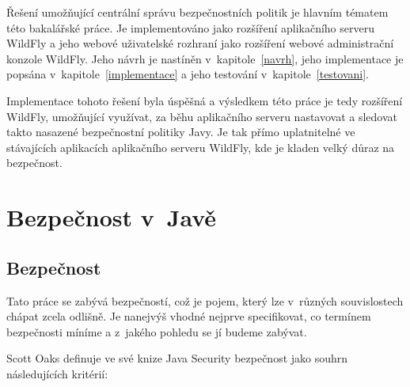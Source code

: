 Řešení umožňující centrální správu bezpečnostních politik je hlavním tématem této bakalářské práce.
Je implementováno jako rozšíření aplikačního serveru WildFly a jeho webové uživatelské rozhraní jako rozšíření webové administrační konzole WildFly.
Jeho návrh je nastíněn v~kapitole~\ref{navrh}, jeho implementace je popsána v~kapitole~\ref{implementace} a jeho testování v~kapitole~\ref{testovani}.

Implementace tohoto řešení byla úspěšná a výsledkem této práce je tedy rozšíření WildFly, umožňující využívat, za běhu aplikačního serveru
nastavovat a sledovat takto nasazené bezpečnostní politiky Javy.
Je tak přímo uplatnitelné ve stávajících aplikacích aplikačního serveru WildFly, kde je kladen velký důraz na bezpečnost.

\chapter{Bezpečnost v~Javě} \label{teoretickyUvod}

\section{Bezpečnost}

Tato práce se zabývá bezpečností, což je pojem, který lze v~různých souvislostech chápat zcela odlišně. Je nanejvýš vhodné nejprve specifikovat, co termínem bezpečnosti míníme a z~jakého pohledu se jí budeme zabývat.

Scott Oaks definuje ve své knize Java Security bezpečnost jako souhrn následujících kritérií:~\cite{oaks}

